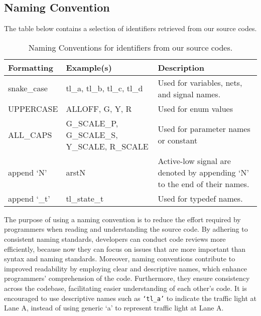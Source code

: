 \subsection {Naming Convention}
The table below contains a selection of identifiers retrieved from our source codes.
\begin{table}[H]
	\centering
	\setlength{\arrayrulewidth}{0.5mm}
	\setlength{\tabcolsep}{18pt}
	\renewcommand{\arraystretch}{1.5}
	\begin{tabular}{ |p{3cm}|p{3cm}|p{4cm}| }
		\hline
		\textbf{Formatting} & \textbf{Example(s)}                          & \textbf{Description}                                                      \\
		\hline
		snake\_case         & tl\_a, tl\_b, tl\_c, tl\_d                   & Used for variables, nets, and signal names.                               \\
		\hline
		UPPERCASE           & ALLOFF, G, Y, R                              & Used for enum values                                                      \\
		\hline
		ALL\_CAPS           & G\_SCALE\_P, G\_SCALE\_S, Y\_SCALE, R\_SCALE & Used for parameter names or constant                                      \\
		\hline
		append ‘N’          & arstN                                        & Active-low signal are denoted by appending ‘N’ to the end of their names. \\
		\hline
		append ‘\_t’        & tl\_state\_t                                 & Used for typedef names.                                                   \\
		\hline
	\end{tabular}
	\caption{Naming Conventions for identifiers from our source codes.}
	\label{tab:identifiers}
\end{table}
The purpose of using a naming convention is to reduce the effort required by programmers when reading and understanding the source code. By adhering to consistent naming standards, developers can conduct code reviews more efficiently, because now they can focus on issues that are more important than syntax and naming standards. Moreover, naming conventions contribute to improved readability by employing clear and descriptive names, which enhance programmers' comprehension of the code. Furthermore, they ensure consistency across the codebase, facilitating easier understanding of each other's code. It is encouraged to use descriptive names such as \texttt{‘tl\_a’} to indicate the traffic light at Lane A, instead of using generic ‘a’ to represent traffic light at Lane A.
\newpage
